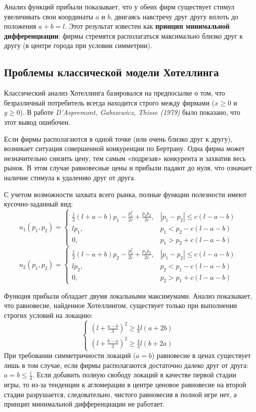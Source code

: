 Анализ функций прибыли показывает, что у обеих фирм существует стимул увеличивать свои координаты $a$ и $b$, двигаясь навстречу друг другу вплоть до положения $a + b = l$. Этот результат известен как \textbf{принцип минимальной дифференциации}: фирмы стремятся располагаться максимально близко друг к другу (в центре города при условии симметрии).

\subsection{Проблемы классической модели Хотеллинга}

Классический анализ Хотеллинга базировался на предпосылке о том, что безразличный потребитель всегда находится строго между фирмами ($x \ge 0$ и $y \ge 0$). В работе \textit{D’Aspremont, Gabszewicz, Thisse (1979)} было показано, что этот вывод ошибочен.

Если фирмы располагаются в одной точке (или очень близко друг к другу), возникает ситуация совершенной конкуренции по Бертрану. Одна фирма может незначительно снизить цену, тем самым «подрезав» конкурента и захватив весь рынок. В этом случае равновесные цены и прибыли падают до нуля, что означает наличие стимула к удалению друг от друга.

С учетом возможности захвата всего рынка, полные функции полезности имеют кусочно-заданный вид:
\[
u_1(p_1, p_2) = 
\begin{cases} 
\frac{1}{2} (l + a - b) p_1 - \frac{p_1^2}{2c} + \frac{p_1 p_2}{2c}, & |p_1 - p_2| \le c(l - a - b) \\
l p_1, & p_1 < p_2 - c(l - a - b) \\
0, & p_1 > p_2 + c(l - a - b)
\end{cases}
\]
\[
u_2(p_1, p_2) = 
\begin{cases} 
\frac{1}{2} (l - a + b) p_2 - \frac{p_2^2}{2c} + \frac{p_1 p_2}{2c}, & |p_1 - p_2| \le c(l - a - b) \\
l p_2, & p_2 < p_1 - c(l - a - b) \\
0, & p_2 > p_1 + c(l - a - b)
\end{cases}
\]

Функция прибыли обладает двумя локальными максимумами. Анализ показывает, что равновесие, найденное Хотеллингом, существует только при выполнении строгих условий на локацию:
\[
\begin{cases}
\left( l + \frac{a - b}{3} \right)^2 \ge \frac{4}{3} l (a + 2b) \\
\left( l + \frac{b - a}{3} \right)^2 \ge \frac{4}{3} l (b + 2a)
\end{cases}
\]
При требовании симметричности локаций ($a = b$) равновесие в ценах существует лишь в том случае, если фирмы располагаются достаточно далеко друг от друга: $a = b \le \frac{l}{4}$. Если добавить полную свободу локаций в качестве первой стадии игры, то из-за тенденции к агломерации в центре ценовое равновесие на второй стадии разрушается, следовательно, чистого равновесия в полной игре нет, а принцип минимальной дифференциации не работает.

